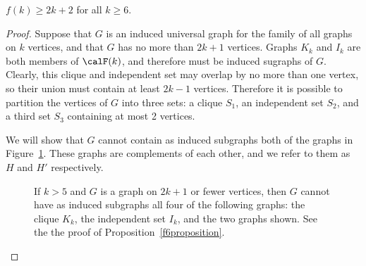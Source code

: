 \begin{proposition}\label{f6proposition}
    $f(k) \geq 2k + 2$ for all $k \geq 6$.
\end{proposition}
\begin{proof}

    Suppose that $G$ is an induced universal graph for the family of all graphs
    on $k$ vertices, and that $G$ has no more than $2k + 1$ vertices.  Graphs
    $K_k$ and $I_k$ are both members of $\calF(k)$, and therefore must
    be induced sugraphs of $G$.  Clearly, this clique and
    independent set may overlap by no more than one vertex, so their union must
    contain at least $2k - 1$ vertices.  Therefore it is possible to partition
    the vertices of $G$ into three sets: a clique $S_1$, an independent set
    $S_2$, and a third set $S_3$ containing at most 2 vertices.

    We will show that $G$ cannot contain as induced subgraphs both
    of the graphs in Figure~\ref{fig:boundproof}.  These graphs are complements
    of each other, and we refer to them as $H$ and $H'$ respectively.

\begin{figure}[htb]
    \centering
{}
\qquad \qquad
{}
\caption{If $k > 5$ and $G$ is a graph on $2k + 1$ or fewer vertices, then
$G$ cannot have as induced subgraphs all four of the following graphs: the
clique $K_k$, the independent set $I_k$, and
the two graphs shown. See the the proof of Proposition~\ref{f6proposition}.}
\label{fig:boundproof}
\end{figure}


\end{proof}
